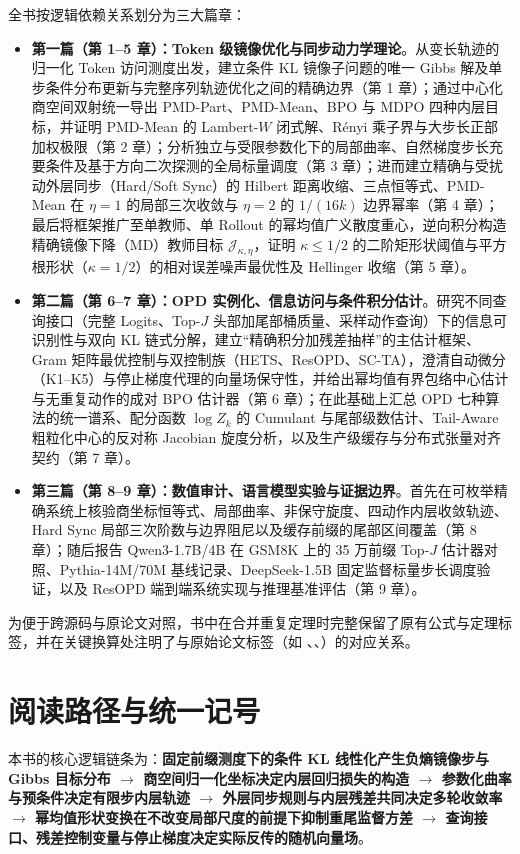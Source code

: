 \documentclass[lang=cn,scheme=chinese,openany]{elegantbook}
\begin{document}
全书按逻辑依赖关系划分为三大篇章：
\begin{itemize}
\item \textbf{第一篇（第 1--5 章）：Token 级镜像优化与同步动力学理论}。从变长轨迹的归一化 Token 访问测度出发，建立条件 KL 镜像子问题的唯一 Gibbs 解及单步条件分布更新与完整序列轨迹优化之间的精确边界（第 1 章）；通过中心化商空间双射统一导出 PMD-Part、PMD-Mean、BPO 与 MDPO 四种内层目标，并证明 PMD-Mean 的 Lambert-$W$ 闭式解、R\'enyi 乘子界与大步长正部加权极限（第 2 章）；分析独立与受限参数化下的局部曲率、自然梯度步长充要条件及基于方向二次探测的全局标量调度（第 3 章）；进而建立精确与受扰动外层同步（Hard/Soft Sync）的 Hilbert 距离收缩、三点恒等式、PMD-Mean 在 $\eta=1$ 的局部三次收敛与 $\eta=2$ 的 $1/(16k)$ 边界幂率（第 4 章）；最后将框架推广至单教师、单 Rollout 的幂均值广义散度重心，逆向积分构造精确镜像下降（MD）教师目标 $\mathcal J_{\kappa,\eta}$，证明 $\kappa\le 1/2$ 的二阶矩形状阈值与平方根形状（$\kappa=1/2$）的相对误差噪声最优性及 Hellinger 收缩（第 5 章）。
\item \textbf{第二篇（第 6--7 章）：OPD 实例化、信息访问与条件积分估计}。研究不同查询接口（完整 Logits、Top-$J$ 头部加尾部桶质量、采样动作查询）下的信息可识别性与双向 KL 链式分解，建立“精确积分加残差抽样”的主估计框架、Gram 矩阵最优控制与双控制族（HETS、ResOPD、SC-TA），澄清自动微分（K1--K5）与停止梯度代理的向量场保守性，并给出幂均值有界包络中心估计与无重复动作的成对 BPO 估计器（第 6 章）；在此基础上汇总 OPD 七种算法的统一谱系、配分函数 $\log Z_k$ 的 Cumulant 与尾部级数估计、Tail-Aware 粗粒化中心的反对称 Jacobian 旋度分析，以及生产级缓存与分布式张量对齐契约（第 7 章）。
\item \textbf{第三篇（第 8--9 章）：数值审计、语言模型实验与证据边界}。首先在可枚举精确系统上核验商坐标恒等式、局部曲率、非保守旋度、四动作内层收敛轨迹、Hard Sync 局部三次阶数与边界阻尼以及缓存前缀的尾部区间覆盖（第 8 章）；随后报告 Qwen3-1.7B/4B 在 GSM8K 上的 35 万前缀 Top-$J$ 估计器对照、Pythia-14M/70M 基线记录、DeepSeek-1.5B 固定监督标量步长调度验证，以及 ResOPD 端到端系统实现与推理基准评估（第 9 章）。
\end{itemize}

为便于跨源码与原论文对照，书中在合并重复定理时完整保留了原有公式与定理标签，并在关键换算处注明了与原始论文标签（如 、、）的对应关系。

\chapter*{阅读路径与统一记号}
本书的核心逻辑链条为：\textbf{固定前缀测度下的条件 KL 线性化产生负熵镜像步与 Gibbs 目标分布 $\longrightarrow$ 商空间归一化坐标决定内层回归损失的构造 $\longrightarrow$ 参数化曲率与预条件决定有限步内层轨迹 $\longrightarrow$ 外层同步规则与内层残差共同决定多轮收敛率 $\longrightarrow$ 幂均值形状变换在不改变局部尺度的前提下抑制重尾监督方差 $\longrightarrow$ 查询接口、残差控制变量与停止梯度决定实际反传的随机向量场}。
\end{document}
